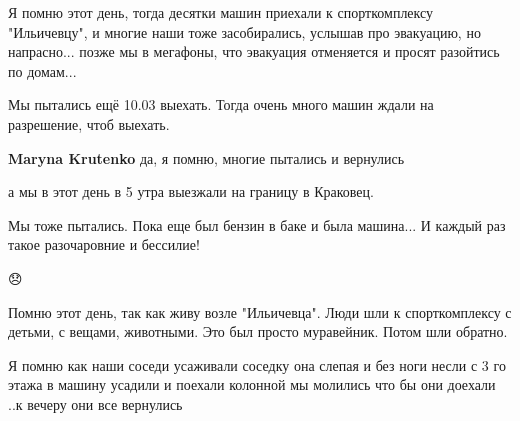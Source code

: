  
 
 
 
 

\qqSecCmt


Я помню этот день, тогда десятки машин приехали к спорткомплексу "Ильичевцу", и
многие наши тоже засобирались, услышав про эвакуацию, но напрасно... позже мы в
мегафоны, что эвакуация отменяется и просят разойтись по домам...


Мы пытались ещё 10.03 выехать. Тогда очень много машин ждали на разрешение, чтоб выехать.

\begin{itemize} %
\textbf{Maryna Krutenko} да, я помню, многие пытались и вернулись
\end{itemize} %


а мы в этот день в 5 утра выезжали на границу в Краковец.


Мы тоже пытались. Пока еще был бензин в баке и была машина... И каждый раз
такое разочаровние и бессилие!


😞


Помню этот день, так как живу возле "Ильичевца". Люди шли к спорткомплексу с
детьми, с вещами, животными. Это был просто муравейник. Потом шли обратно.


Я помню как наши соседи усаживали соседку она слепая и без ноги несли с 3 го
этажа в машину усадили и поехали колонной мы молились что бы они доехали ..к
вечеру они все вернулись
